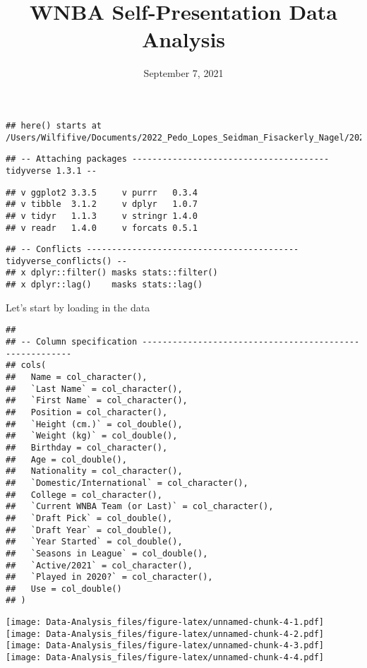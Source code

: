 \documentclass[
]{article}
\title{WNBA Self-Presentation Data Analysis}
\author{}
\date{\vspace{-2.5em}September 7, 2021}
\begin{document}
\maketitle

\begin{verbatim}
## here() starts at /Users/Wilfifive/Documents/2022_Pedo_Lopes_Seidman_Fisackerly_Nagel/2022_Pedo_Lopes_Seidman_Fisackerly_Nagel
\end{verbatim}

\begin{verbatim}
## -- Attaching packages --------------------------------------- tidyverse 1.3.1 --
\end{verbatim}

\begin{verbatim}
## v ggplot2 3.3.5     v purrr   0.3.4
## v tibble  3.1.2     v dplyr   1.0.7
## v tidyr   1.1.3     v stringr 1.4.0
## v readr   1.4.0     v forcats 0.5.1
\end{verbatim}

\begin{verbatim}
## -- Conflicts ------------------------------------------ tidyverse_conflicts() --
## x dplyr::filter() masks stats::filter()
## x dplyr::lag()    masks stats::lag()
\end{verbatim}

Let's start by loading in the data

\begin{verbatim}
## 
## -- Column specification --------------------------------------------------------
## cols(
##   Name = col_character(),
##   `Last Name` = col_character(),
##   `First Name` = col_character(),
##   Position = col_character(),
##   `Height (cm.)` = col_double(),
##   `Weight (kg)` = col_double(),
##   Birthday = col_character(),
##   Age = col_double(),
##   Nationality = col_character(),
##   `Domestic/International` = col_character(),
##   College = col_character(),
##   `Current WNBA Team (or Last)` = col_character(),
##   `Draft Pick` = col_double(),
##   `Draft Year` = col_double(),
##   `Year Started` = col_double(),
##   `Seasons in League` = col_double(),
##   `Active/2021` = col_character(),
##   `Played in 2020?` = col_character(),
##   Use = col_double()
## )
\end{verbatim}

\texttt{[image: Data-Analysis\_files/figure-latex/unnamed-chunk-4-1.pdf]}
\texttt{[image: Data-Analysis\_files/figure-latex/unnamed-chunk-4-2.pdf]}
\texttt{[image: Data-Analysis\_files/figure-latex/unnamed-chunk-4-3.pdf]}
\texttt{[image: Data-Analysis\_files/figure-latex/unnamed-chunk-4-4.pdf]}
\end{document}
